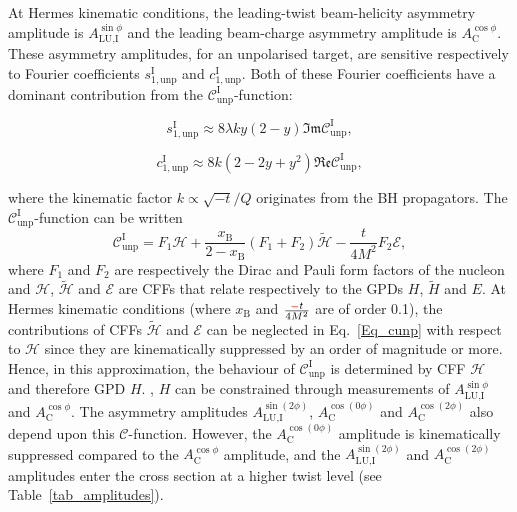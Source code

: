 At H{\sc ermes} kinematic conditions, the leading-twist beam-helicity asymmetry amplitude is $A_{\textrm{LU,I}}^{\sin\phi}$ and the leading beam-charge asymmetry amplitude is $A^{\cos\phi}_{\textrm{C}}$. These asymmetry amplitudes, for an unpolarised target, are sensitive respectively to Fourier coefficients $s_{1,\textrm{unp}}^{\textrm{I}}$ and $c_{1,\textrm{unp}}^{\textrm{I}}$. Both of these Fourier coefficients have a dominant contribution from the $\mathcal{C}_{\textrm{unp}}^{\textrm{I}}$-function:
\begin{center}
\begin{equation}
 s_{1,\textrm{unp}}^{\textrm{I}} \approx 8\lambda ky(2-y)\mathfrak{Im}\mathcal{C}_{\textrm{unp}}^{\textrm{I}},
\label{eq:s1}
\end{equation}
\end{center}
\begin{center}
\begin{equation}
 c_{1,\textrm{unp}}^{\textrm{I}} \approx 8k(2- 2y + y^{2})\mathfrak{Re}\mathcal{C}_{\textrm{unp}}^{\textrm{I}},
\label{eq:c1}
\end{equation}
\end{center}
where the kinematic factor $k \propto \sqrt{-t}/Q$ originates from the BH
propagators. The $\mathcal{C}_{\textrm{unp}}^{\textrm{I}}$-function can be
written
\cite{Bel02b} 
\begin{equation}
 \mathcal{C}_{\textrm{unp}}^{\textrm{I}} = F_{1}\mathcal{H} + \frac{x_{\textrm{B}}}{2-x_{\textrm{B}}}(F_{1}+F_{2})\widetilde{\mathcal{H}} -\frac{t}{4M^{2}}F_{2}\mathcal{E},
\label{Eq_cunp}
\end{equation}
where $F_{1}$ and $F_{2}$ are respectively the Dirac and Pauli form
factors of the nucleon and $\mathcal{H}$, $\widetilde{\mathcal{H}}$ and
$\mathcal{E}$ are CFFs that relate respectively to the GPDs $H$,
$\widetilde{H}$ and $E$.  At H{\sc ermes} kinematic
conditions (where $x_{\textrm{B}}$ and $\frac{{\color{red}{-}\color{black}}t}{4M^2}$ are of order 0.1), the
contributions of CFFs $\widetilde{\mathcal{H}}$ and $\mathcal{E}$ can be
neglected in Eq.~\ref{Eq_cunp}  with respect to $\mathcal{H}$ since they
are kinematically suppressed by an order of magnitude or more.
Hence, in this approximation, the behaviour of
$\mathcal{C}_{\textrm{unp}}^{\textrm{I}}$ is determined by CFF $\mathcal{H}$
and therefore GPD $H$. , $H$ can be constrained through
measurements of $A_{\textrm{LU,I}}^{\sin\phi}$ and $A^{\cos\phi}_{\textrm{C}}$.
The asymmetry amplitudes $A_{\textrm{LU},\textrm{I}}^{\sin(2\phi)}$,
$A^{\cos(0\phi)}_{\textrm{C}}$ and $A^{\cos(2\phi)}_{\textrm{C}}$ also depend
upon this $\mathcal{C}$-function. However, the $A^{\cos(0\phi)}_{\textrm{C}}$ amplitude is kinematically suppressed compared to the $A^{\cos\phi}_{\textrm{C}}$ amplitude, and the  $A_{\textrm{LU,I}}^{\sin(2\phi)}$ and $A^{\cos(2\phi)}_{\textrm{C}}$ amplitudes enter the cross section at a higher
twist level (see Table~\ref{tab_amplitudes}).

